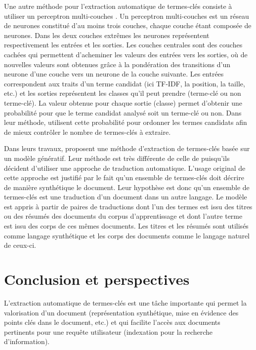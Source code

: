     Une autre méthode pour l'extraction automatique de termes-clés consiste à
    utiliser un perceptron multi-couches \citep{sarkar2010neuralnetwork}. Un
    perceptron multi-couches est un réseau de neurones constitué d'au moins
    trois couches, chaque couche étant composée de neurones. Dans les deux
    couches extrêmes les neurones représentent respectivement les entrées et les
    sorties. Les couches centrales sont des couches cachées qui permettent
    d'acheminer les valeurs des entrées vers les sorties, où de nouvelles
    valeurs sont obtenues grâce à la pondération des transitions d'un neurone
    d'une couche vers un neurone de la couche suivante. Les entrées
    correspondent aux traits d'un terme candidat (ici TF-IDF, la position, la
    taille, etc.) et les sorties représentent les classes qu'il peut prendre
    (terme-clé ou non terme-clé). La valeur obtenue pour chaque sortie (classe)
    permet d'obtenir une probabilité pour que le terme candidat analysé soit un
    terme-clé ou non. Dans leur méthode, \citet{sarkar2010neuralnetwork}
    utilisent cette probabilité pour ordonner les termes candidats afin de mieux
    contrôler le nombre de termes-clés à extraire.

    Dans leurs travaux, \citet{liu2011vocabularygap} proposent une méthode
    d'extraction de termes-clés basée sur un modèle génératif. Leur méthode est
    très différente de celle de \citet{witten1999kea} puisqu'ils décident
    d'utiliser une approche de traduction automatique. L'usage original de cette
    approche est justifié par le fait qu'un ensemble de termes-clés doit décrire
    de manière synthétique le document. Leur hypothèse est donc qu'un ensemble
    de termes-clés est une traduction d'un document dans un autre langage.
    Le modèle est appris à partir de paires de traductions dont l'un
    des termes est issu des titres ou des résumés des documents du corpus
    d'apprentissage et dont l'autre terme est issu des corps de ces mêmes
    documents. Les titres et les résumés sont utilisés comme langage synthétique
    et les corps des documents comme le langage naturel de ceux-ci.

\section{Conclusion et perspectives}
\label{sec:conclusion}
  L'extraction automatique de termes-clés est une tâche importante qui permet la
  valorisation d'un document (représentation synthétique, mise en évidence des
  points clés dans le document, etc.) et qui facilite l'accès aux documents
  pertinents pour une requête utilisateur (indexation pour la recherche
  d'information).
  
